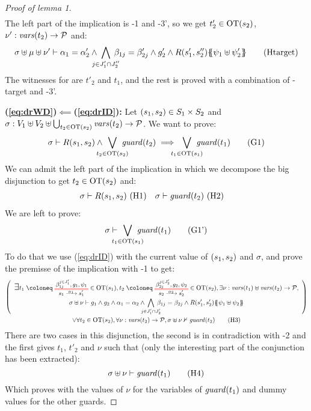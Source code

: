 \documentclass{article}
\begin{document}
\begin{proof}[Proof of lemma 1]
\begin{multline}
	\end{multline}
	The left part of the implication is \hyp{1} and \hyp{3'}, so we get \(t'_2 \in \mathrm{OT}{\left(s_2\right)}\), \(\nu': \mathit{vars}{\left(t_2\right)} \to \mathcal{P}\) and:
	\[ \sigma \uplus \mu \uplus \nu' \vdash \alpha_1 = \alpha'_2 \wedge \bigwedge_\subbox{j \in J'_1 \cap J''_2} \beta_{1j} = \beta'_{2j} \wedge g'_2 \wedge R\mpar{s'_1, s''_2}\psubst{\psi_1 \uplus \psi'_2} \hyp{target} \]
	The witnesses for  are \(t'_2\) and \(t_1\), and the rest is proved with a combination of \hyp{target} and \hyp{3'}.
\item[\bf(\ref{eq:drWD})\(\impliedby\)(\ref{eq:drID}):]
	Let \({\left(s_1, s_2\right)} \in S_1 \times S_2\) and \(\sigma: V_1 \uplus V_2 \uplus \bigcup_{t_2 \in \mathrm{OT}{\left(s_2\right)}} \mathit{vars}{\left(t_2\right)} \to \mathcal{P}\).
	We want to prove:
	\[ \sigma \vdash R\mpar{s_1, s_2} \wedge \bigvee_\subbox{t_2 \in \fOT{s_2}} \fguard{t_2} \implies \bigvee_\subbox{t_1 \in \fOT{s_1}} \fguard{t_1} \goal{1} \]
	We can admit the left part of the implication in which we decompose the big disjunction to get \(t_2 \in \mathrm{OT}{\left(s_2\right)}\) and:
	\begin{align*}
		\sigma \vdash R\mpar{s_1, s_2} & \text{ \hyp{1}} &
		\sigma \vdash \fguard{t_2} & \text{ \hyp{2}}
	\end{align*}
	We are left to prove:
	\[ \sigma \vdash \bigvee_\subbox{t_1 \in \fOT{s_1}} \fguard{t_1} \goal{1'} \]
	To do that we use (\ref{eq:drID}) with the current value of \({\left(s_1, s_2\right)}\) and \(\sigma\), and prove the premisse of the implication with \hyp{1} to get:
	\begin{multline}
		\mpar{\everymath{\displaystyle}\begin{array}{c}
			\bigsymb{\exists} t_1 \defobject \OTx{1}{}{1}{1} \in \fOT{s_1}, t_2 \defobject \OTx{2}{}{2}{2} \in \fOT{s_2}, \exists \nu: \fvars{t_1} \uplus \fvars{t_2} \to \values, \\
			\sigma \uplus \nu \vdash g_1 \wedge g_2 \wedge \alpha_1 = \alpha_2 \wedge \bigwedge_\subbox{j \in J'_1 \cap J'_2} \beta_{1j} = \beta_{2j} \wedge R\mpar{s'_1, s'_2}\psubst{\psi_1 \uplus \psi_2}
		\end{array}} \\
		\vee \forall t_2 \in \fOT{s_2}, \forall \nu: \fvars{t_2} \to \values, \sigma \uplus \nu \nvdash \fguard{t_2} \hyp{3}
	\end{multline}
	There are two cases in this disjunction, the second is in contradiction with \hyp{2} and the first gives \(t_1\), \(t'_2\) and \(\nu\) such that (only the interesting part of the conjunction has been extracted):
	\[ \sigma \uplus \nu \vdash \fguard{t_1} \hyp{4} \]
	Which proves  with the values of \(\nu\) for the variables of \(\mathit{guard}{\left(t_1\right)}\) and dummy values for the other guards.
\end{proof}
\end{document}
